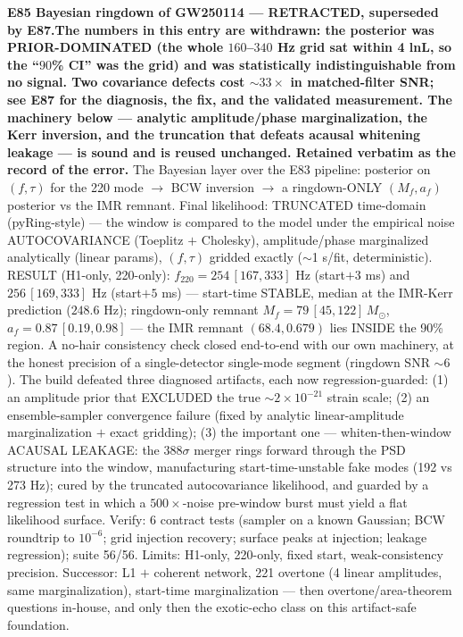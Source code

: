 \documentclass[10pt]{article}
\newcommand{\entry}[2]{\vspace{5pt}\noindent\textbf{#1}\quad #2\par}
\begin{document}
\entry{E85 Bayesian ringdown of GW250114 --- \textbf{RETRACTED, superseded by E87.}}{\textbf{The numbers in
this entry are withdrawn: the posterior was PRIOR-DOMINATED (the whole $160$--$340$ Hz grid sat within
4 lnL, so the ``$90$\% CI'' was the grid) and was statistically indistinguishable from no signal. Two
covariance defects cost ${\sim}33\times$ in matched-filter SNR; see E87 for the diagnosis, the fix, and
the validated measurement. The machinery below --- analytic amplitude/phase marginalization, the Kerr
inversion, and the truncation that defeats acausal whitening leakage --- is sound and is reused unchanged.
Retained verbatim as the record of the error.} The
Bayesian layer over the E83 pipeline: posterior on $(f,\tau)$ for the 220 mode $\to$ BCW inversion $\to$ a
ringdown-ONLY $(M_f,a_f)$ posterior vs the IMR remnant. Final likelihood: TRUNCATED time-domain
(pyRing-style) --- the window is compared to the model under the empirical noise AUTOCOVARIANCE (Toeplitz
$+$ Cholesky), amplitude/phase marginalized analytically (linear params), $(f,\tau)$ gridded exactly
($\sim$1 s/fit, deterministic). RESULT (H1-only, 220-only): $f_{220}=254\,[167,333]$ Hz (start$+3$ ms) and
$256\,[169,333]$ Hz (start$+5$ ms) --- start-time STABLE, median at the IMR-Kerr prediction ($248.6$ Hz);
ringdown-only remnant $M_f=79\,[45,122]\,M_\odot$, $a_f=0.87\,[0.19,0.98]$ --- the IMR remnant
$(68.4,0.679)$ lies INSIDE the 90\% region. A no-hair consistency check closed end-to-end with our own
machinery, at the honest precision of a single-detector single-mode segment (ringdown SNR $\sim6$). The
build defeated three diagnosed artifacts, each now regression-guarded: (1) an amplitude prior that
EXCLUDED the true $\sim2\times10^{-21}$ strain scale; (2) an ensemble-sampler convergence failure (fixed
by analytic linear-amplitude marginalization $+$ exact gridding); (3) the important one ---
whiten-then-window ACAUSAL LEAKAGE: the $388\sigma$ merger rings forward through the PSD structure into
the window, manufacturing start-time-unstable fake modes (192 vs 273 Hz); cured by the truncated
autocovariance likelihood, and guarded by a regression test in which a $500\times$-noise pre-window burst
must yield a flat likelihood surface. Verify: 6 contract tests (sampler on a known Gaussian; BCW roundtrip
to $10^{-6}$; grid injection recovery; surface peaks at injection; leakage regression); suite 56/56.
Limits: H1-only, 220-only, fixed start, weak-consistency precision. Successor: L1 $+$ coherent network,
221 overtone (4 linear amplitudes, same marginalization), start-time marginalization --- then
overtone/area-theorem questions in-house, and only then the exotic-echo class on this artifact-safe
foundation.}
\end{document}
